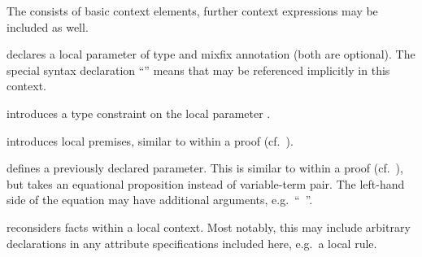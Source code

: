 \begin{isabellebody}
\begin{isamarkuptext}
\begin{descr}
  The  consists of basic context elements, further context
  expressions may be included as well.

  \begin{descr}

  \item [\mbox{\isa{\isakeyword{fixes}}}~\isa{{\isachardoublequote}x\ {\isacharcolon}{\isacharcolon}\ {\isasymtau}\ {\isacharparenleft}mx{\isacharparenright}{\isachardoublequote}}] declares a local
  parameter of type \isa{{\isasymtau}} and mixfix annotation  (both
  are optional).  The special syntax declaration ``\isa{{\isachardoublequote}{\isacharparenleft}{\isasymSTRUCTURE}{\isacharparenright}{\isachardoublequote}}'' means that  may be referenced
  implicitly in this context.

  \item [\mbox{\isa{\isakeyword{constrains}}}~\isa{{\isachardoublequote}x\ {\isacharcolon}{\isacharcolon}\ {\isasymtau}{\isachardoublequote}}] introduces a type
  constraint \isa{{\isasymtau}} on the local parameter .

  \item [\mbox{\isa{\isakeyword{assumes}}}~\isa{{\isachardoublequote}a{\isacharcolon}\ {\isasymphi}\isactrlsub {\isadigit{1}}\ {\isasymdots}\ {\isasymphi}\isactrlsub n{\isachardoublequote}}]
  introduces local premises, similar to \mbox{} within a
  proof (cf.\ ).

  \item [\mbox{\isa{\isakeyword{defines}}}~\isa{{\isachardoublequote}a{\isacharcolon}\ x\ {\isasymequiv}\ t{\isachardoublequote}}] defines a previously
  declared parameter.  This is similar to \mbox{} within a
  proof (cf.\ ), but \mbox{}
  takes an equational proposition instead of variable-term pair.  The
  left-hand side of the equation may have additional arguments, e.g.\
  ``\mbox{}~''.

  \item [\mbox{\isa{\isakeyword{notes}}}~\isa{{\isachardoublequote}a\ {\isacharequal}\ b\isactrlsub {\isadigit{1}}\ {\isasymdots}\ b\isactrlsub n{\isachardoublequote}}]
  reconsiders facts within a local context.  Most notably, this may
  include arbitrary declarations in any attribute specifications
  included here, e.g.\ a local \mbox{\isa{simp}} rule.


\end{descr}
\end{descr}
\end{isamarkuptext}
\end{isabellebody}

